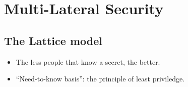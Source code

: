 \mode*




\section{Multi-Lateral Security}


\subsection{The Lattice model}

\begin{frame}
  \begin{idea}
    \begin{itemize}
      \item The less people that know a secret, the better.
      \item \enquote{Need-to-know basis}: the principle of least priviledge.
    \end{itemize}
  \end{idea}
\end{frame}


